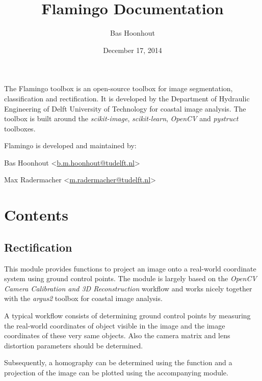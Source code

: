 \documentclass[letterpaper,10pt,english]{sphinxmanual}
\title{Flamingo Documentation}
\date{December 17, 2014}
\author{Bas Hoonhout}
\begin{document}
\maketitle
\tableofcontents
{}\label{index::doc}


The Flamingo toolbox is an open-source toolbox for image segmentation, classification and rectification.
It is developed by the Department of Hydraulic Engineering of Delft University of Technology for coastal image analysis.
The toolbox is built around the \emph{scikit-image}, \emph{scikit-learn}, \emph{OpenCV} and \emph{pystruct} toolboxes.

Flamingo is developed and maintained by:

\begin{DUlineblock}{0em}
\item[] Bas Hoonhout \textless{}\href{mailto:b.m.hoonhout@tudelft.nl}{b.m.hoonhout@tudelft.nl}\textgreater{}
\item[] Max Radermacher \textless{}\href{mailto:m.radermacher@tudelft.nl}{m.radermacher@tudelft.nl}\textgreater{}
\end{DUlineblock}


\chapter{Contents}
\label{index:contents}\label{index:welcome-to-flamingo-s-documentation}

\section{Rectification}
\label{rectification:rectification}\label{rectification::doc}
This module provides functions to project an image onto a
real-world coordinate system using ground control points. The
module is largely based on the \emph{OpenCV Camera Calibration and 3D
Reconstruction} workflow and works nicely together with the \emph{argus2}
toolbox for coastal image analysis.

A typical workflow consists of determining ground control points
by measuring the real-world coordinates of object visible in the
image and the image coordinates of these very same objects. Also
the camera matrix and lens distortion parameters should be
determined.

Subsequently, a homography can be determined using the
{\hyperref[rectification:flamingo.rectification.rectification.find_homography]{}} function and a projection of the image can be
plotted using the accompanying {\hyperref[rectification:module-flamingo.rectification.plot]{}} module.
\end{document}
